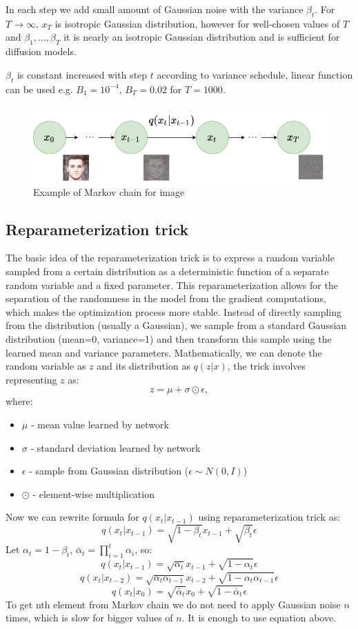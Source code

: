 \documentclass[11pt,a4paper]{report}
\begin{document}
In each step we add small amount of Gaussian noise with the variance $\beta_t$. For $T\rightarrow\infty$, $x_T$ is isotropic Gaussian distribution, however for well-chosen values of $T$ and $\beta_1,..., \beta_T$ it is nearly an isotropic Gaussian distribution and is sufficient for diffusion models.

$\beta_t$ is constant increased with step $t$ according to variance schedule, linear function can be used e.g. $B_1=10^{-4}$, $B_T=0.02$ for $T=1000$. \cite{DDPM}

\begin{figure}[H]
	\centering
	\includegraphics[width=\textwidth]{images/forward-diffusion}
    \caption{Example of Markov chain for image \cite{DDPM}}
\end{figure}

\subsection{Reparameterization trick} %
The basic idea of the reparameterization trick is to express a random variable sampled from a certain distribution as a deterministic function of a separate random variable and a fixed parameter. This reparameterization allows for the separation of the randomness in the model from the gradient computations, which makes the optimization process more stable. Instead of directly sampling from the distribution (usually a Gaussian), we sample from a standard Gaussian distribution (mean=0, variance=1) and then transform this sample using the learned mean and variance parameters. 
Mathematically, we can denote the random variable as $z$ and its distribution as $q(z|x)$, the trick involves representing $z$ as:
\[z=\mu + \sigma \odot \epsilon,\]
where:
\begin{itemize}
\item $\mu$ - mean value learned by network 
\item $\sigma$ - standard deviation learned by network 
\item $\epsilon$ - sample from Gaussian distribution ($\epsilon \sim N(0,I)$)
\item $\odot$ - element-wise multiplication
\end{itemize}
Now we can rewrite formula for $q(x_t|x_{t-1})$ using reparameterization trick as:
\[q(x_t|x_{t-1}) = \sqrt{1 - \beta_t}x_{t-1} + \sqrt{\beta_t}\epsilon\]
Let $\alpha_t = 1 - \beta_t$, $\bar{\alpha}_t = \prod_{i=1}^{t}{\alpha_i}$, so:
\[q(x_t|x_{t-1}) = \sqrt{\alpha_t}x_{t-1} + \sqrt{1-\alpha_{t}}\epsilon\]
\[q(x_t|x_{t-2}) = \sqrt{\alpha_t \alpha_{t-1}}x_{t-2} + \sqrt{1-\alpha_t \alpha_{t-1}}\epsilon\]
\[q(x_t|x_0) = \sqrt{\bar{\alpha}_t}x_0 + \sqrt{1-\bar{\alpha}_t}\epsilon\]
To get nth element from Markov chain we do not need to apply Gaussian noise $n$ times, which is slow for bigger values of $n$. It is enough to use equation above. \cite{lw_diffusion}
\end{document}
